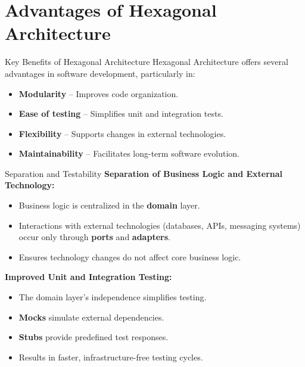 \documentclass[aspectratio=169, table]{beamer}
\begin{document}
\section{Advantages of Hexagonal Architecture}

\begin{frame}[fragile]{Key Benefits of Hexagonal Architecture}
	\vspace{20pt}
	Hexagonal Architecture offers several advantages in software development, particularly in:
	\begin{itemize}
		\item \textbf{Modularity} – Improves code organization.
		\item \textbf{Ease of testing} – Simplifies unit and integration tests.
		\item \textbf{Flexibility} – Supports changes in external technologies.
		\item \textbf{Maintainability} – Facilitates long-term software evolution.
	\end{itemize}
\end{frame}

\begin{frame}[fragile]{Separation and Testability}
	\vspace{20pt}
	\textbf{Separation of Business Logic and External Technology:}
	\begin{itemize}
		\item Business logic is centralized in the \textbf{domain} layer.
		\item Interactions with external technologies (databases, APIs, messaging systems) occur only through \textbf{ports} and \textbf{adapters}.
		\item Ensures technology changes do not affect core business logic.
	\end{itemize}
	
	\textbf{Improved Unit and Integration Testing:}
	\begin{itemize}
		\item The domain layer’s independence simplifies testing.
		\item \textbf{Mocks} simulate external dependencies.
		\item \textbf{Stubs} provide predefined test responses.
		\item Results in faster, infrastructure-free testing cycles.
	\end{itemize}
\end{frame}
\end{document}
